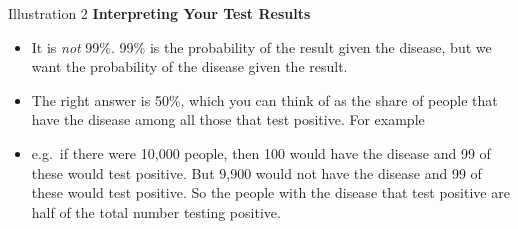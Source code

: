 \documentclass[
  11pt,
  ignorenonframetext,
]{beamer}
\begin{document}
\begin{frame}{Illustration 2 \textbf{Interpreting Your Test Results}}
\protect\hypertarget{illustration-2-interpreting-your-test-results-1}{}
\begin{itemize}
\item
  It is \emph{not} 99\%. 99\% is the probability of the result given the
  disease, but we want the probability of the disease given the result.
\item
  The right answer is 50\%, which you can think of as the share of
  people that have the disease among all those that test positive. For
  example
\item
  e.g.~if there were 10,000 people, then 100 would have the disease and
  99 of these would test positive. But 9,900 would not have the disease
  and 99 of these would test positive. So the people with the disease
  that test positive are half of the total number testing positive.
\end{itemize}
\end{frame}
\end{document}
